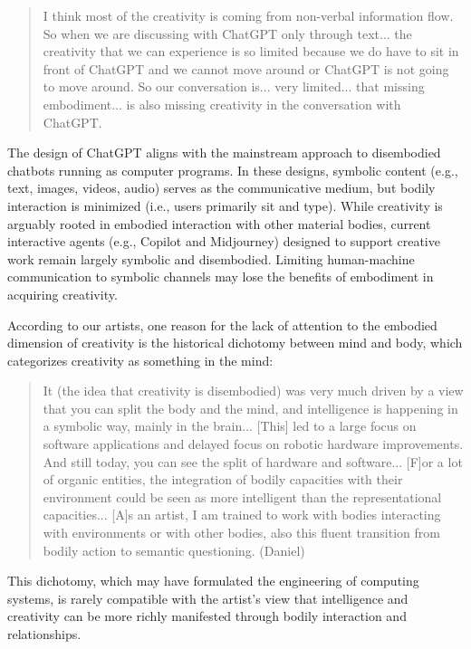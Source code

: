 \begin{quote}
  I think most of the creativity is coming from non-verbal information flow. So when we are discussing with ChatGPT only through text... the creativity that we can experience is so limited because we do have to sit in front of ChatGPT and we cannot move around or ChatGPT is not going to move around. So our conversation is... very limited... that missing embodiment... is also missing creativity in the conversation with ChatGPT.
\end{quote}

The design of ChatGPT aligns with the mainstream approach to disembodied chatbots running as computer programs. In these designs, symbolic content (e.g., text, images, videos, audio) serves as the communicative medium, but bodily interaction is minimized (i.e., users primarily sit and type). While creativity is arguably rooted in embodied interaction with other material bodies, current interactive agents (e.g., Copilot and Midjourney) designed to support creative work remain largely symbolic and disembodied. Limiting human-machine communication to symbolic channels may lose the benefits of embodiment in acquiring creativity.

According to our artists, one reason for the lack of attention to the embodied dimension of creativity is the historical dichotomy between mind and body, which categorizes creativity as something in the mind:

\begin{quote}
     It (the idea that creativity is disembodied) was very much driven by a view that you can split the body and the mind, and intelligence is happening in a symbolic way, mainly in the brain... [This] led to a large focus on software applications and delayed focus on robotic hardware improvements. And still today, you can see the split of hardware and software... [F]or a lot of organic entities, the integration of bodily capacities with their environment could be seen as more intelligent than the representational capacities... [A]s an artist, I am trained to work with bodies interacting with environments or with other bodies, also this fluent transition from bodily action to semantic questioning. (Daniel)
\end{quote}

This dichotomy, which may have formulated the engineering of computing systems, is rarely compatible with the artist's view that intelligence and creativity can be more richly manifested through bodily interaction and relationships.

